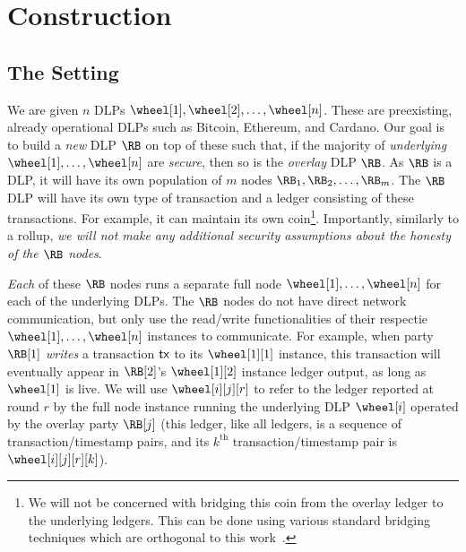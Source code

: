 \section{Construction}\label{sec:construction}

\subsection{The Setting}

We are given $n$ DLPs $\wheel[1], \wheel[2], \ldots, \wheel[n]$. These are preexisting, already operational
DLPs such as Bitcoin, Ethereum, and Cardano. Our goal is to build a \emph{new} DLP $\RB$
on top of these such that, if the majority of \emph{underlying}
$\wheel[1], \ldots, \wheel[n]$ are \emph{secure}, then so is the
\emph{overlay} DLP $\RB$. As $\RB$ is a DLP, it will have its own population of $m$ nodes
$\RB_1, \RB_2, \ldots, \RB_m$. The $\RB$ DLP will have its own type of transaction and a
ledger consisting of these transactions. For example, it can maintain its own coin\footnote{
We will not be concerned with bridging this coin from the overlay ledger to the underlying
ledgers. This can be done using various standard bridging techniques which are orthogonal
to this work~\cite{pow-sidechains,pos-sidechains,zkbridge}.}. Importantly, similarly to
a rollup, \emph{we will not make any additional security assumptions about the honesty of the
$\RB$ nodes}.

\emph{Each} of these $\RB$ nodes runs a separate full node $\wheel[1], \ldots, \wheel[n]$ for each of
the underlying DLPs. The $\RB$ nodes do not have direct network communication, but only
use the read/write functionalities of their respectie $\wheel[1], \ldots, \wheel[n]$ instances to communicate.
For example, when party $\RB[1]$ \emph{writes} a transaction $\textsf{tx}$ to its $\wheel[1][1]$ instance,
this transaction will eventually appear in $\RB[2]$'s $\wheel[1][2]$ instance ledger output,
as long as $\wheel[1]$ is live.
We will use $\wheel[i][j][r]$ to refer to the ledger reported at round $r$ by the full node instance
running the underlying DLP $\wheel[i]$ operated by the overlay party $\RB[j]$
(this ledger, like all ledgers, is a sequence of transaction/timestamp pairs, and its
$k^\text{th}$ transaction/timestamp pair is $\wheel[i][j][r][k]$).

